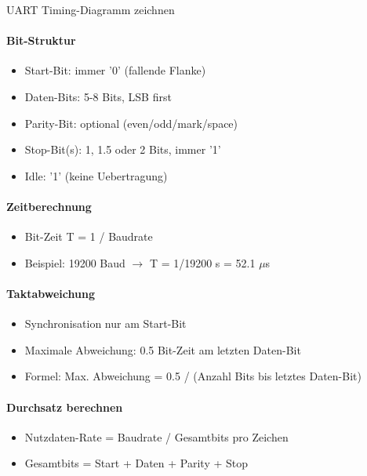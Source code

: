 \begin{KR}{UART Timing-Diagramm zeichnen}\\
    \paragraph{Bit-Struktur}
    \begin{itemize}
        \item Start-Bit: immer '0' (fallende Flanke)
        \item Daten-Bits: 5-8 Bits, LSB first
        \item Parity-Bit: optional (even/odd/mark/space)
        \item Stop-Bit(s): 1, 1.5 oder 2 Bits, immer '1'
        \item Idle: '1' (keine Uebertragung)
    \end{itemize}
    
    \paragraph{Zeitberechnung}
    \begin{itemize}
        \item Bit-Zeit T = 1 / Baudrate
        \item Beispiel: 19200 Baud $\rightarrow$ T = 1/19200 s = 52.1 $\mu$s
    \end{itemize}
    
    \paragraph{Taktabweichung}
    \begin{itemize}
        \item Synchronisation nur am Start-Bit
        \item Maximale Abweichung: 0.5 Bit-Zeit am letzten Daten-Bit
        \item Formel: Max. Abweichung = 0.5 / (Anzahl Bits bis letztes Daten-Bit)
    \end{itemize}
    
    \paragraph{Durchsatz berechnen}
    \begin{itemize}
        \item Nutzdaten-Rate = Baudrate / Gesamtbits pro Zeichen
        \item Gesamtbits = Start + Daten + Parity + Stop
    \end{itemize}
\end{KR}

